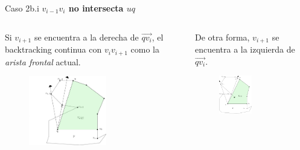 \documentclass[aspectratio=169,xcolor=dvipsnames, t]{beamer}
\begin{document}
\begin{frame}{Caso 2b.i}
  \textbf{$v_{i-1}v_{i}$ no intersecta $uq$}\\ 
  \begin{columns}
    \begin{column}{0.45\textwidth}
      Si $v_{i+1}$ se encuentra a la derecha de $\overrightarrow{qv_{i}}$, el backtracking continua con $v_{i}v_{i+1}$ como la \textit{arista frontal} actual.
      \begin{figure}
        \centering
        \includegraphics[width=0.6\textwidth]{imagenes/Caso2.5b.png}
      \end{figure}
    \end{column}
    \begin{column}{0.45\textwidth}  %
      De otra forma, $v_{i+1}$ se encuentra a la izquierda de $\overrightarrow{qv_{i}}.$
      \begin{figure}
        \centering
        \includegraphics[width=0.5\textwidth]{imagenes/Caso2.6a.png}
      \end{figure}
    \end{column}
  \end{columns}
\end{frame}
\end{document}

